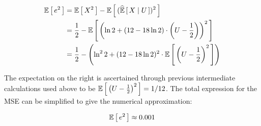 \documentclass[12pt]{article}%
\begin{document}
\begin{enumerate}
  \begin{align*}
    \mathbb{E}\left[\,e^2\,\right] &= \mathbb{E}\left[\,X^2\,\right] - \mathbb{E}\left[\,(\widehat{ \mathbb{E}}\left[\,{X} \mid {U}\,\right])^2\,\right] \\
    & = \frac{1}{2} - \mathbb{E}\left[\,\left( \ln{2} + (12 - 18\ln{2})\cdot\left(U - \frac{1}{2}\right)\right)^2\,\right] \\
    & = \frac{1}{2} - \left(\ln^2{2} + (12 - 18\ln{2})^2\cdot \mathbb{E}\left[\,\left(U - \frac{1}{2}\right)^2\,\right]\right)
  \end{align*}

  The expectation on the right is ascertained through previous intermediate calculations used above to be $\mathbb{E}\left[\,\left(U - \frac{1}{2}\right)^2\,\right] = 1/12$. The total expression for the MSE can be simplified to give the numerical approximation:

  \[ \mathbb{E}\left[\,e^2\,\right] \approx 0.001 \]
\end{enumerate}
\end{document}
